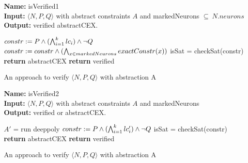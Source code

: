 \begin{algorithm}[t]
  \textbf{Name: } isVerified1 \\
  \textbf{Input: } $\langle N,P,Q \rangle$ with abstract constraints $A$ and markedNeurons $\subseteq ~ N.neurons$ \\
  \textbf{Output: } verified abstractCEX. 
  \begin{algorithmic}[1]
    \State $constr := P \land (\bigwedge_{i=1}^k lc_i)\land \neg Q$
    \State $constr := constr \land (\bigwedge_{x \in markedNeurons} exactConstr(x))$ 
    \State isSat = checkSat(constr)
      \State \textbf{return} abstractCEX
    \Else
      \State \textbf{return} verified
    \EndIf
  \end{algorithmic}
  \caption{An approach to verify $\langle N,P,Q \rangle$ with abstraction A}
  \label{algo:verif1}
\end{algorithm}

\begin{algorithm}[t]
  \textbf{Name: } isVerified2 \\
  \textbf{Input: } $\langle N,P,Q \rangle$ with abstract constraints $A$ and markedNeurons \\
  \textbf{Output: } verified or  abstractCEX. 
  \begin{algorithmic}[1]
      \State $A'$ = run deeppoly
      \State $constr := P \land (\bigwedge_{i=1}^k lc'_i) \land \neg Q$ 
      \State isSat = checkSat(constr)
        \State \textbf{return} abstractCEX
      \EndIf
    \EndFor
    \State \textbf{return} verified
  \end{algorithmic}
  \caption{An approach to verify $\langle N,P,Q \rangle$ with abstraction A}
  \label{algo:verif2}
\end{algorithm}













